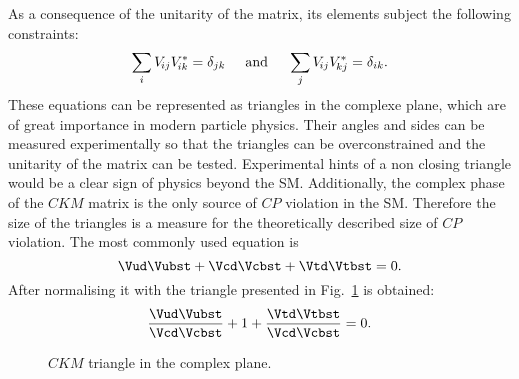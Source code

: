 As a consequence of the unitarity of the matrix, its elements subject the following constraints:
\begin{equation}
\sum_{i} V_{{\kern -0.1em}ij}V_{{\kern -0.1em}ik}^{*} = \delta_{jk}\hspace{0.5cm}\text{and}\hspace{0.5cm}
\sum_{j} V_{{\kern -0.1em}ij}V_{{\kern -0.1em}kj}^{*} = \delta_{ik}.
\end{equation}
These equations can be represented as triangles in the complexe plane, which are of great importance in modern particle physics.
Their angles and sides can be measured experimentally so that the triangles can be overconstrained and the unitarity of
the matrix can be tested. Experimental hints of a non closing triangle would be a clear sign of physics beyond the \ac{SM}.
Additionally, the complex phase of the $CKM$ matrix is the only source of $CP$ violation in the \ac{SM}. Therefore
the size of the triangles is a measure for the theoretically described size of $CP$ violation. The most commonly used equation is
\begin{equation}
\Vud\Vubst + \Vcd\Vcbst + \Vtd\Vtbst = 0.
\end{equation}
After normalising it with \Vcd\Vcbst the triangle presented in Fig.~\ref{fig:ckmtheory} is obtained:
\begin{equation}
\frac{\Vud\Vubst}{\Vcd\Vcbst} + 1 + \frac{\Vtd\Vtbst}{\Vcd\Vcbst} = 0.
\end{equation}
\begin{figure}[tbp]
	\centering
	
	\caption{$CKM$ triangle in the complex plane.}
	\label{fig:ckmtheory}
\end{figure}
